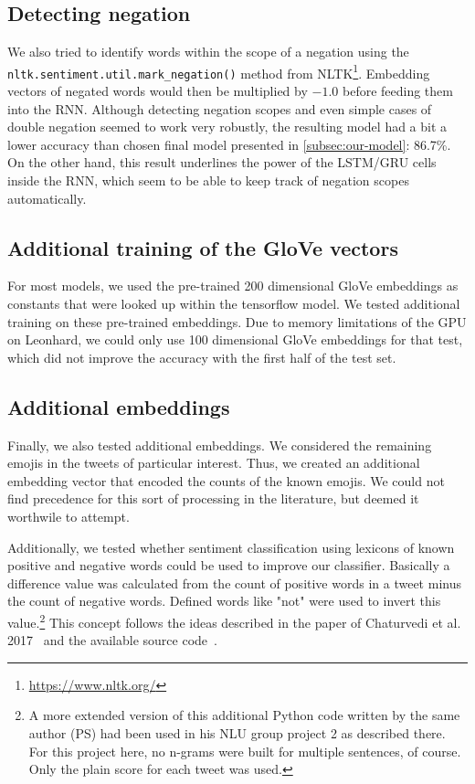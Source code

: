 \documentclass[10pt,conference,compsocconf]{IEEEtran}
\begin{document}
\subsection*{Detecting negation}

We also tried to identify words within the scope of a negation using
the \texttt{nltk.sentiment.util.mark\_negation()} method from
NLTK\footnote{\url{https://www.nltk.org/}}.
Embedding vectors of negated words would then be multiplied by $-1.0$ before
feeding them into the RNN. Although detecting negation scopes and even
simple cases of double negation seemed to work very robustly, the
resulting model had a bit a lower accuracy than chosen final model presented in
\autoref{subsec:our-model}: 86.7\%. On the other hand, this result underlines
the power of the LSTM/GRU cells inside the RNN, which seem to be able
to keep track of negation scopes automatically.


\subsection*{Additional training of the GloVe vectors}

For most models, we used the pre-trained 200 dimensional GloVe embeddings as
constants that were looked up within the tensorflow model. We tested additional
training on these pre-trained embeddings. Due to memory limitations of the GPU on
Leonhard, we could only use 100 dimensional GloVe embeddings for that test, which
did not improve the accuracy with the first half of the test set.


\subsection*{Additional embeddings}

Finally, we also tested additional embeddings.  We considered the
remaining emojis in the tweets of particular interest. Thus, we
created an additional embedding vector that encoded the counts of the
known emojis. We could not find precedence for this sort of processing
in the literature, but deemed it worthwile to attempt.

Additionally, we tested whether sentiment classification using lexicons of known 
positive and negative words could be used to improve our classifier.
Basically a difference value was calculated from the count of positive words in a 
tweet minus the count of negative words. Defined words like "not" were used to 
invert this value.\footnote{A more extended version of this additional Python code 
written by the same author (PS) had been used in his NLU group project 2 as 
described there. For this project here, no n-grams were built for multiple 
sentences, of course. Only the plain score for each tweet was used.} This concept 
follows the ideas described in the paper of Chaturvedi et al. 
2017~\cite{chaturvedi2017} and the available source code~\cite{chaturvedi_code}.
\end{document}
